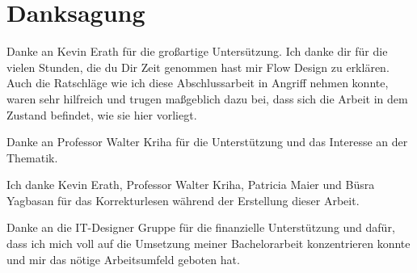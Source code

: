 \chapter*{Danksagung}

Danke an Kevin Erath für die großartige Untersützung.
Ich danke dir für die vielen Stunden, die du Dir Zeit genommen hast mir Flow
Design zu erklären.
Auch die Ratschläge wie ich diese Abschlussarbeit in Angriff nehmen konnte, waren sehr
hilfreich und trugen maßgeblich dazu bei, dass sich die Arbeit in dem Zustand 
befindet, wie sie hier vorliegt.

Danke an Professor Walter Kriha für die Unterstützung und das Interesse an der Thematik.

Ich danke Kevin Erath, Professor Walter Kriha, Patricia Maier und Büsra Yagbasan für das Korrekturlesen während der Erstellung dieser Arbeit.

Danke an die IT-Designer Gruppe für die finanzielle Unterstützung
und dafür, dass ich mich voll auf die Umsetzung meiner Bachelorarbeit konzentrieren konnte
und mir das nötige Arbeitsumfeld geboten hat.






